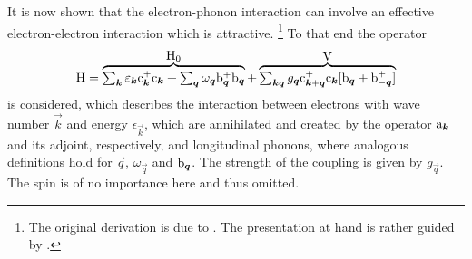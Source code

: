 It is now shown that the electron-phonon interaction can involve an effective
electron-electron interaction which is attractive.%
%
\footnote{The original derivation is due to  \cite{Froehlich52}.
The presentation at hand is rather guided by  \cite{Czycholl08}.}
%
To that end the  operator
%
\begin{gather*}
    \op H = \hyper{
        \sum_{\vec k} \epsilon_{\vec k} \op c_{\vec k}^+ \op c_{\vec k} +
        \sum_{\vec q} \omega_{\vec q} \op b_{\vec q}^+ \op b_{\vec q}
    }{\op H_0} + \hyper{
        \sum_{\vec k \vec q} g_{\vec q} \op c_{\vec k + \vec q}^+ \op c_{\vec k}
        [\op b_{\vec q} + \op b_{-\vec q}^+]
    }{\op V}
\end{gather*}
%
is considered, which describes the interaction between electrons with wave
number $\vec k$ and energy $\epsilon_{\vec k}$, which are annihilated and
created by the  operator $\mathrm a_{\boldsymbol k}$ and its adjoint,
respectively, and longitudinal phonons, where analogous definitions hold for
$\vec q$, $\omega_{\vec q}$ and $\mathrm b_{\boldsymbol q}$. The strength of the coupling
is given by $g_{\vec q}$. The spin is of no importance here and thus omitted.

